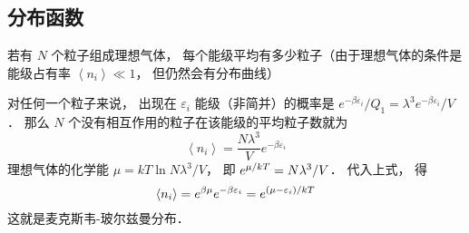 \subsection{分布函数}
若有 $N$ 个粒子组成理想气体， 每个能级平均有多少粒子（由于理想气体的条件是能级占有率 $\left\langle {{n_i}} \right\rangle \ll 1$，  但仍然会有分布曲线）

对任何一个粒子来说， 出现在 ${\varepsilon _i}$ 能级（非简并）的概率是 ${{{e^{ - \beta {\varepsilon _i}}}}}/{{{Q_1}}} = {{{\lambda ^3}}}{e^{ - \beta {\varepsilon _i}}}/{V}$．  那么 $N$ 个没有相互作用的粒子在该能级的平均粒子数就为
\begin{equation}
  \left\langle {{n_i}} \right\rangle  = \frac{{N{\lambda ^3}}}{V}{e^{ - \beta {\varepsilon _i}}}
\end{equation}
理想气体的化学能 $\mu  = kT\ln {{N{\lambda ^3}}}/{V}$，  即 ${e^{{\mu  \mathord{\left/
 {\vphantom {\mu  {kT}}} \right.
 \kern-\nulldelimiterspace} {kT}}}} = {{N{\lambda ^3}}}/{V}$．  代入上式， 得
\begin{equation}
  \left\langle {{n_i}} \right\rangle  = {e^{\beta \mu }}{e^{ - \beta {\varepsilon _i}}} = {e^{{{\left( {\mu  - {\varepsilon _i}} \right)} \mathord{\left/
 {\vphantom {{\left( {\mu  - {\varepsilon _i}} \right)} {kT}}} \right.
 \kern-\nulldelimiterspace} {kT}}}}
\end{equation}
这就是麦克斯韦-玻尔兹曼分布．\\

